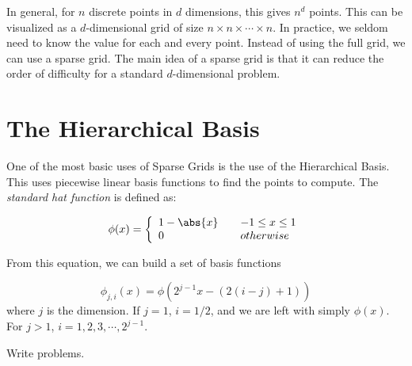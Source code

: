 In general, for $n$ discrete points in $d$ dimensions, this gives $n^d$ points.  This can be visualized as a $d$-dimensional grid of size $n \times n \times \cdots \times n$. In practice, we seldom need to know the value for each and every point.  Instead of using the full grid, we can use a sparse grid.  The main idea of a sparse grid is that it can reduce the order of difficulty for a standard $d$-dimensional problem.

\section*{The Hierarchical Basis}
One of the most basic uses of Sparse Grids is the use of the Hierarchical Basis.  This uses piecewise linear basis functions to find the points to compute.  The \emph{standard hat function} is defined as:

\begin{equation}
\phi(x) = \left\{
        \begin{array}{ll}
            1-\abs{x} & \quad -1 \leq x \leq 1 \\
            0 & \quad otherwise
        \end{array}
    \right.
\end{equation}

From this equation, we can build a set of basis functions 

\begin{equation}
\phi_{j,i}(x) = \phi(2^{j-1}x - (2(i-j)+1))
\end{equation}
where $j$ is the dimension.  If $j=1$, $i=1/2$, and we are left with simply $\phi(x)$.  For $j>1$, $i=1,2,3,\cdots,2^{j-1}$.

\begin{problem}
Write problems.
\end{problem}